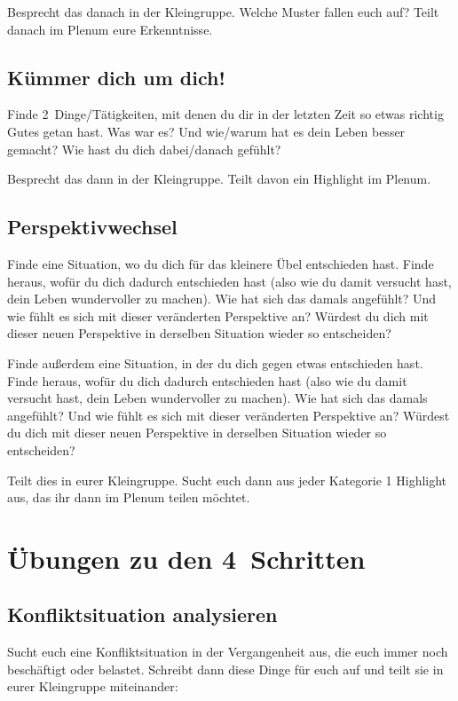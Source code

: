 Besprecht das danach in der Kleingruppe. Welche Muster fallen euch auf? Teilt danach im Plenum eure Erkenntnisse.


\subsection{Kümmer dich um dich!}

Finde 2~Dinge/Tätigkeiten, mit denen du dir in der letzten Zeit so etwas richtig Gutes getan hast. Was war es? Und wie/warum hat es dein Leben besser gemacht? Wie hast du dich dabei/danach gefühlt?

Besprecht das dann in der Kleingruppe. Teilt davon ein Highlight im Plenum.


\subsection{Perspektivwechsel}

Finde eine Situation, wo du dich für \glqq das kleinere Übel\grqq{} entschieden hast. Finde heraus, wofür du dich dadurch entschieden hast (also wie du damit versucht hast, dein Leben wundervoller zu machen). Wie hat sich das damals angefühlt? Und wie fühlt es sich mit dieser veränderten Perspektive an? Würdest du dich mit dieser neuen Perspektive in derselben Situation wieder so entscheiden?

Finde außerdem eine Situation, in der du dich gegen etwas entschieden hast. Finde heraus, wofür du dich dadurch entschieden hast (also wie du damit versucht hast, dein Leben wundervoller zu machen). Wie hat sich das damals angefühlt? Und wie fühlt es sich mit dieser veränderten Perspektive an? Würdest du dich mit dieser neuen Perspektive in derselben Situation wieder so entscheiden?

Teilt dies in eurer Kleingruppe. Sucht euch dann aus jeder Kategorie 1 Highlight aus, das ihr dann im Plenum teilen möchtet.


\section{Übungen zu den 4~Schritten}


\subsection{Konfliktsituation analysieren}

Sucht euch eine Konfliktsituation in der Vergangenheit aus, die euch immer noch beschäftigt oder belastet. Schreibt dann diese Dinge für euch auf und teilt sie in eurer Kleingruppe miteinander:

